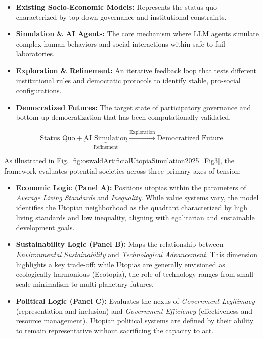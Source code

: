 \documentclass[jou,floatsintext]{apa7}
\begin{document}
\begin{itemize}
    \item \textbf{Existing Socio-Economic Models:} Represents the status quo characterized by top-down governance and institutional constraints.
    \item \textbf{Simulation \& AI Agents:} The core mechanism where LLM agents simulate complex human behaviors and social interactions within safe-to-fail laboratories.
    \item \textbf{Exploration \& Refinement:} An iterative feedback loop that tests different institutional rules and democratic protocols to identify stable, pro-social configurations.
    \item \textbf{Democratized Futures:} The target state of participatory governance and bottom-up democratization that has been computationally validated.
\end{itemize}

$$
\text{Status Quo} + \underbrace{\text{AI Simulation}}_{\text{Refinement}} \xrightarrow{\text{Exploration}} \text{Democratized Future}
$$


As illustrated in Fig. \ref{fig:oswaldArtificialUtopiaSimulation2025_Fig3}, the framework evaluates potential societies across three primary axes of tension:

\begin{itemize}
    \item \textbf{Economic Logic (Panel A):} Positions utopias within the parameters of \textit{Average Living Standards} and \textit{Inequality}. While value systems vary, the model identifies the Utopian neighborhood as the quadrant characterized by high living standards and low inequality, aligning with egalitarian and sustainable development goals.
    \item \textbf{Sustainability Logic (Panel B):} Maps the relationship between \textit{Environmental Sustainability} and \textit{Technological Advancement}. This dimension highlights a key trade-off: while Utopias are generally envisioned as ecologically harmonious (Ecotopia), the role of technology ranges from small-scale minimalism to multi-planetary futures.
    \item \textbf{Political Logic (Panel C):} Evaluates the nexus of \textit{Government Legitimacy} (representation and inclusion) and \textit{Government Efficiency} (effectiveness and resource management). Utopian political systems are defined by their ability to remain representative without sacrificing the capacity to act.
\end{itemize}
\end{document}
